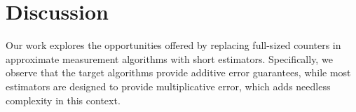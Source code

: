\begin{comment}
\begin{algorithm}[ht]
\caption {Weighted Algorithm for an $n$-bit counter} \label{alg:estimateK}
\begin{algorithmic}[1]
\Statex Initialization: $C\gets 0$, $\mathfrak I \gets 1$
\Procedure{Add}{$\mathfrak w$}
    \State $w_1 = \floor{\mathfrak w p}$
    \State $w_2 = \mathfrak w - w_1/p$
        \State $h\gets \max\set{0,\floor{\log_2 (C+w_1+1)} - n}$ \Comment{\# halvings}
        \State $C \gets \floor{(C+w_1) / 2^h}$
        \State $p\gets p/2^h$
        \While{$w_2\ge \mathfrak I$}
            \If {$C = 2^n - 1$}
                \State $C \gets 2^{n-1}$
                \State $p \gets p/2$
            \Else
                { $C \gets C + 1$}
            \EndIf
            \State $\mathfrak I\gets \mbox{Geo}(p)$
        \EndWhile
\EndProcedure
\end{algorithmic}
\label{alg:CFS-FR}
\end{algorithm}
\end{comment}

\section{Discussion}
Our work explores the opportunities offered by replacing full-sized counters in approximate measurement algorithms with short estimators. Specifically, we observe that the target algorithms provide additive error guarantees, while most estimators are designed to provide multiplicative error, which adds needless complexity in this context. 


